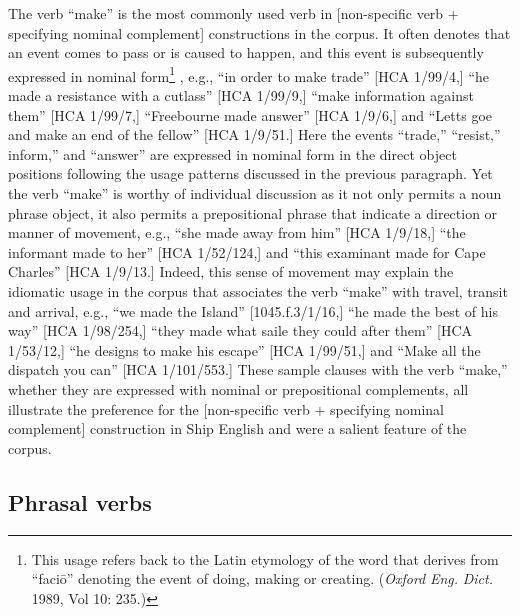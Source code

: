 The verb “make” is the most commonly used verb in [non-specific verb + specifying nominal complement] constructions in the corpus. It often denotes that an event comes to pass or is caused to happen, and this event is subsequently expressed in nominal form\footnote{This usage refers back to the Latin etymology of the word that derives from “{faciō}” denoting the event of doing, making or creating. (\textit{Oxford} \textit{Eng.} \textit{Dict.} 1989, Vol 10: 235.)} , e.g., “in order to make trade” [HCA 1/99/4,] “he made a resistance with a cutlass” [HCA 1/99/9,] “make information against them” [HCA 1/99/7,] “Freebourne made answer” [HCA 1/9/6,] and “Letts goe and make an end of the fellow” [HCA 1/9/51.] Here the events “trade,” “resist,” inform,” and “answer” are expressed in nominal form in the direct object positions following the usage patterns discussed in the previous paragraph. Yet the verb “make” is worthy of individual discussion as it not only permits a noun phrase object, it also permits a prepositional phrase that indicate a direction or manner of movement, e.g., “she made away from him” [HCA 1/9/18,] “the informant made to her” [HCA 1/52/124,] and “this examinant made for Cape Charles” [HCA 1/9/13.] Indeed, this sense of movement may explain the idiomatic usage in the corpus that associates the verb “make” with travel, transit and arrival, e.g., “we made the Island” [1045.f.3/1/16,] “he made the best of his way” [HCA 1/98/254,] “they made what saile they could after them” [HCA 1/53/12,] “he designs to make his escape” [HCA 1/99/51,] and “Make all the dispatch you can” [HCA 1/101/553.] These sample clauses with the verb “make,” whether they are expressed with nominal or prepositional complements, all illustrate the preference for the [non-specific verb + specifying nominal complement] construction in Ship English and were a salient feature of the corpus. 

\subsection{\textbf{Phrasal} \textbf{verbs}}%

